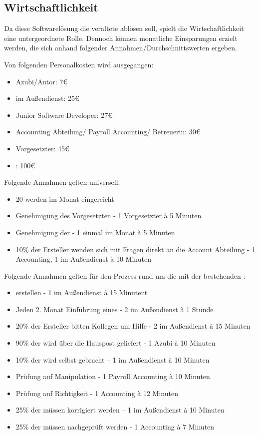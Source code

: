 \subsection{Wirtschaftlichkeit}
Da diese Softwarelösung die veraltete  ablösen soll, spielt die Wirtschaftlichkeit eine untergeordnete Rolle. Dennoch können monatliche Einsparungen erzielt werden, die sich anhand folgender Annahmen/Durchschnittswerten ergeben.

Von folgenden Personalkosten wird ausgegangen:
\begin{itemize}
\item Azubi/Autor: 7€
\item {} im Außendienst: 25€
\item Junior Software Developer: 27€ 
\item Accounting Abteilung/ Payroll Accounting/ Betreuerin: 30€
\item Vorgesetzter: 45€
\item {}: 100€
\end{itemize}

Folgende Annahmen gelten universell:
\begin{itemize}
\item 20  werden im Monat eingereicht
\item Genehmigung des Vorgesetzten - 1 Vorgesetzter à 5 Minuten
\item Genehmigung der  - 1  einmal im Monat à 5 Minuten
\item 10\% der Ersteller wenden sich mit Fragen direkt an die Account Abteilung - 1  Accounting, 1  im Außendienst à 10 Minuten
\end{itemize}

Folgende Annahmen gelten für den Prozess rund um die  mit der bestehenden :
\begin{itemize}
\item {} erstellen - 1  im Außendienst à 15 Minutent
\item Jeden 2. Monat Einführung eines  - 2  im Außendienst à 1 Stunde
\item 20\% der Ersteller bitten Kollegen um Hilfe - 2  im Außendienst à 15 Minuten
\item 90\% der  wird über die Hauspost geliefert - 1 Azubi à 10 Minuten
\item 10\% der  wird selbst gebracht – 1  im Außendienst à 10 Minuten
\item Prüfung auf Manipulation - 1  Payroll Accounting à 10 Minuten
\item Prüfung auf Richtigkeit - 1  Accounting à 12 Minuten
\item 25\% der  müssen korrigiert werden – 1  im Außendienst à 10 Minuten
\item 25\% der  müssen nachgeprüft werden - 1  Accounting à 7 Minuten
\end{itemize}

